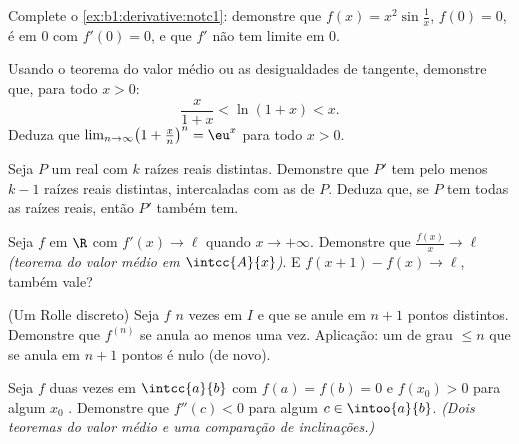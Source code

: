 \begin{exercise}[$\star$]\label{exo:b1:derivative:2}
Complete o \cref{ex:b1:derivative:notc1}: demonstre que $f(x) = x^2
\sin\frac1x$, $f(0) = 0$, é  em $0$ com $f'(0) = 0$,
e que $f'$ não tem limite em $0$.
\end{exercise}

\begin{exercise}[$\star$]\label{exo:b1:derivative:3}
Usando o teorema do valor médio ou as desigualdades de tangente,
demonstre que, para todo $x > 0$:
\[
\frac{x}{1 + x} < \ln(1 + x) < x .
\]
Deduza que $\lim_{n\to\infty} \bigl(1 + \frac xn\bigr)^n = \eu^x$ para
todo $x > 0$.
\end{exercise}

\begin{exercise}[$\star$]\label{exo:b1:derivative:4}
Seja $P$ um  real com $k$ raízes reais distintas. Demonstre que
$P'$ tem pelo menos $k - 1$ raízes reais distintas, intercaladas com as
de $P$. Deduza que, se $P$ tem todas as raízes reais, então $P'$ também
tem.
\end{exercise}

\begin{exercise}[$\star\star$]\label{exo:b1:derivative:5}
Seja $f$  em $\R$ com $f' (x)\to \ell$ quando $x \to
+\infty$. Demonstre que $\frac{f(x)}{x} \to \ell$ \emph{(teorema do valor
médio em $\intcc{A}{x}$)}. E $f(x+1) - f(x) \to \ell$, também vale?
\end{exercise}

\begin{exercise}[$\star\star$]\label{exo:b1:derivative:6}
(Um Rolle discreto) Seja $f$ $n$ vezes  em $I$ e que
se anule em $n + 1$ pontos distintos. Demonstre que $f^{(n)}$ se anula
ao menos uma vez. Aplicação: um  de grau $\leq n$ que se anula
em $n+1$ pontos é nulo (de novo).
\end{exercise}

\begin{exercise}[$\star\star$]\label{exo:b1:derivative:7}
Seja $f$ duas vezes  em $\intcc{a}{b}$ com $f(a) = f(b)
= 0$ e $f(x_0) > 0$ para algum $x_0$ . Demonstre que $f''(c) <
0$ para algum $c \in \intoo{a}{b}$. \emph{(Dois teoremas do valor médio e
uma comparação de inclinações.)}
\end{exercise}

